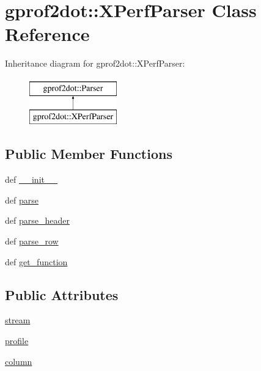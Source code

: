 \hypertarget{classgprof2dot_1_1XPerfParser}{
\section{gprof2dot::XPerfParser Class Reference}
\label{classgprof2dot_1_1XPerfParser}
}
Inheritance diagram for gprof2dot::XPerfParser:\begin{figure}[H]
\begin{center}
\leavevmode
\includegraphics[height=2.000000cm]{classgprof2dot_1_1XPerfParser}
\end{center}
\end{figure}
\subsection*{Public Member Functions}
\begin{DoxyCompactItemize}
\item 
def \hyperlink{classgprof2dot_1_1XPerfParser_a2e75d52bbd69196a7d2a11f341ef9cb1}{\_\-\_\-init\_\-\_\-}
\item 
def \hyperlink{classgprof2dot_1_1XPerfParser_ac98402f482a2413c430558a01f51a75d}{parse}
\item 
def \hyperlink{classgprof2dot_1_1XPerfParser_a76edfcf4cbc019334f2f425d45d08f4c}{parse\_\-header}
\item 
def \hyperlink{classgprof2dot_1_1XPerfParser_a02c38fcf20c568d1b1dca4fae0bf457a}{parse\_\-row}
\item 
def \hyperlink{classgprof2dot_1_1XPerfParser_ab2dfe407d54dad8051e369749d674da5}{get\_\-function}
\end{DoxyCompactItemize}
\subsection*{Public Attributes}
\begin{DoxyCompactItemize}
\item 
\hyperlink{classgprof2dot_1_1XPerfParser_a5416921e1c88257c3d5e642cb0b07606}{stream}
\item 
\hyperlink{classgprof2dot_1_1XPerfParser_a549ac9abfd65063c30bc9983d6bc42ac}{profile}
\item 
\hyperlink{classgprof2dot_1_1XPerfParser_a3fd7c0ff5c2720cfd9fc8bd3ed3615b4}{column}
\end{DoxyCompactItemize}


